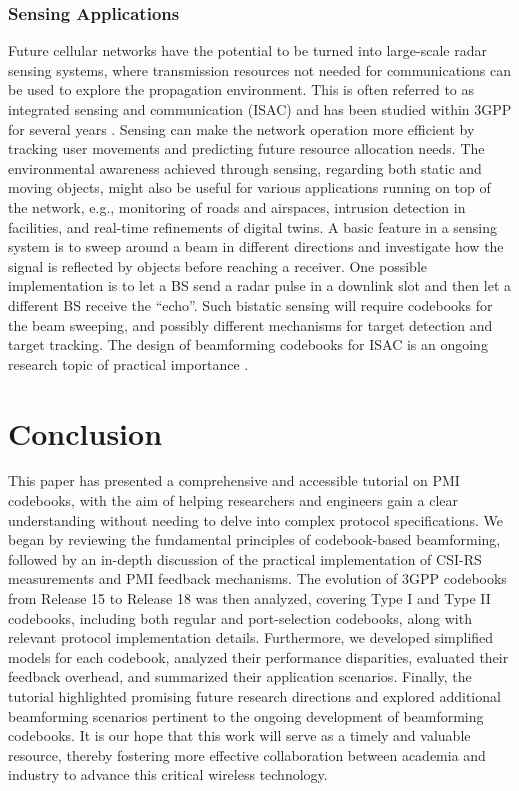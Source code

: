 \documentclass[lettersize,journal]{IEEEtran}
\begin{document}
\subsubsection{Sensing Applications}
Future cellular networks have the potential to be turned into large-scale radar sensing systems, where transmission resources not needed for communications can be used to explore the propagation environment. This is often referred to as integrated sensing and communication (ISAC) \cite{Mishra2019a,Liu2022a
} and has been studied within 3GPP for several years \cite{10349862}. Sensing can make the network operation more efficient by tracking user movements and predicting future resource allocation needs. The environmental awareness achieved through sensing, regarding both static and moving objects, might also be useful for various applications running on top of the network, e.g., monitoring of roads and airspaces, intrusion detection in facilities, and real-time refinements of digital twins. A basic feature in a sensing system is to sweep around a beam in different directions and investigate how the signal is reflected by objects before reaching a receiver. One possible implementation is to let a BS send a radar pulse in a downlink slot and then let a different BS receive the ``echo''. Such bistatic sensing will require codebooks for the beam sweeping, and possibly different mechanisms for target detection and target tracking. The design of beamforming codebooks for ISAC is an ongoing research topic of practical importance \cite{10930389,hussain2025nearfieldisacsynergydualpurpose,10626219}.



\section{Conclusion}\label{conclusion}
This paper has presented a comprehensive and accessible tutorial on PMI codebooks, with the aim of helping researchers and engineers gain a clear understanding without needing to delve into complex protocol specifications. We began by reviewing the fundamental principles of codebook-based beamforming, followed by an in-depth discussion of the practical implementation of CSI-RS measurements and PMI feedback mechanisms. The evolution of 3GPP codebooks from Release 15 to Release 18 was then analyzed, covering Type I and Type II codebooks, including both regular and port-selection codebooks, along with relevant protocol implementation details.  Furthermore, we developed simplified models for each codebook, analyzed their performance disparities, evaluated their feedback overhead, and summarized their application scenarios. Finally, the tutorial highlighted promising future research directions and explored additional beamforming scenarios pertinent to the ongoing development of beamforming codebooks. It is our hope that this work will serve as a timely and valuable resource, thereby fostering more effective collaboration between academia and industry to advance this critical wireless technology.
\end{document}
